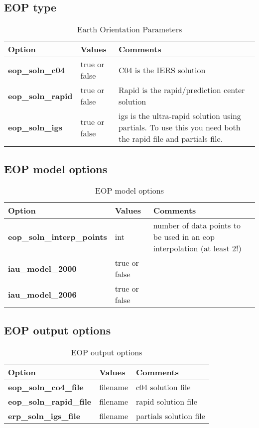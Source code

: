 \subsection{EOP type}
\begin{table}[h!]
	\begin{tabular}{|p{2.5cm}|p{2.5cm}|p{5cm}|}
		\hline
		Option & Values & Comments \\
		\hline
		\textbf{eop\_soln\_c04} & true or false & C04 is the IERS solution\\
		\textbf{eop\_soln\_rapid} & true or false & Rapid is the rapid/prediction center solution\\
		\textbf{eop\_soln\_igs} & true or false & igs is the ultra-rapid solution using partials. To use this you need both the rapid file and partials file.\\
		\hline
	\end{tabular}
	\caption{Earth Orientation Parameters}
	\label{table:yaml}
\end{table}
%
\subsection{EOP model options}
\begin{table}[h!]
	\begin{tabular}{|p{2.5cm}|p{2.5cm}|p{5cm}|}
		\hline
		Option & Values & Comments \\
		\hline
        \textbf{eop\_soln\_interp\_points} & int & number of data points to be used in an eop interpolation (at least 2!)\\
        \textbf{iau\_model\_2000} & true or false & \\
        \textbf{iau\_model\_2006} & true or false & \\
		\hline
	\end{tabular}
	\caption{EOP model options}
	\label{table:yaml}
\end{table}

\subsection{EOP output options}
\begin{table}[h!]
	\begin{tabular}{|p{2.5cm}|p{2.5cm}|p{5cm}|}
		\hline
		Option & Values & Comments \\
		\hline
        \textbf{eop\_soln\_co4\_file} & filename & c04 solution file\\
        \textbf{eop\_soln\_rapid\_file} & filename & rapid solution file\\
        \textbf{erp\_soln\_igs\_file} & filename & partials solution file\\
		\hline
	\end{tabular}
	\caption{EOP output options}
	\label{table:yaml}
\end{table}


